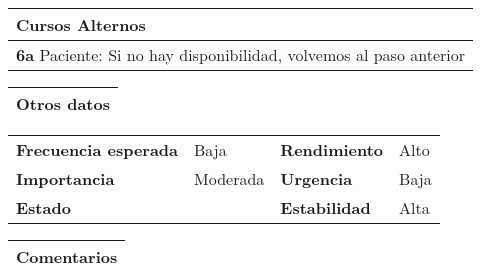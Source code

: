 \documentclass[11pt,a4paper]{article}
\begin{document}
\begin{table}[H]
	\begin{tabularx}{\textwidth}{X}
		\textbf{Cursos Alternos}\\ \hline
		\textbf{6a} Paciente: Si no hay disponibilidad, volvemos al paso anterior & \\
	\end{tabularx}
\end{table}

\begin{table}[H]
	\begin{tabularx}{\textwidth}{X}
		\textbf{Otros datos}\\ \hline
	\end{tabularx}

	\begin{tabularx}{\textwidth}{lXlX}
		\textbf{Frecuencia esperada} & Baja & \textbf{Rendimiento} & Alto\\
		\textbf{Importancia} & Moderada & \textbf{Urgencia} & Baja\\
		\textbf{Estado} &  & \textbf{Estabilidad} & Alta\\
	\end{tabularx}
	
	\begin{tabularx}{\textwidth}{X}
		\textbf{Comentarios}\\ \hline
	\end{tabularx}
\end{table}

\newpage


\end{document}
